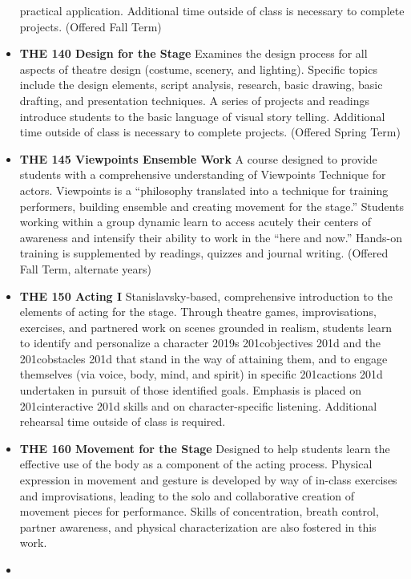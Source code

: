 \documentclass[
  letterpaper,
]{scrbook}
\begin{document}
\begin{itemize}
  practical application. Additional time outside of class is necessary
  to complete projects. (Offered Fall Term)\\
\item
  \textbf{THE 140 Design for the Stage} Examines the design process for
  all aspects of theatre design (costume, scenery, and lighting).
  Specific topics include the design elements, script analysis,
  research, basic drawing, basic drafting, and presentation techniques.
  A series of projects and readings introduce students to the basic
  language of visual story telling. Additional time outside of class is
  necessary to complete projects. (Offered Spring Term)
\item
  \textbf{THE 145 Viewpoints Ensemble Work} A course designed to provide
  students with a comprehensive understanding of Viewpoints Technique
  for actors. Viewpoints is a ``philosophy translated into a technique
  for training performers, building ensemble and creating movement for
  the stage.'' Students working within a group dynamic learn to access
  acutely their centers of awareness and intensify their ability to work
  in the ``here and now.'' Hands-on training is supplemented by
  readings, quizzes and journal writing. (Offered Fall Term, alternate
  years)\\
\item
  \textbf{THE 150 Acting I} Stanislavsky-based, comprehensive
  introduction to the elements of acting for the stage. Through theatre
  games, improvisations, exercises, and partnered work on scenes
  grounded in realism, students learn to identify and personalize a
  character 2019s 201cobjectives 201d and the 201cobstacles 201d that
  stand in the way of attaining them, and to engage themselves (via
  voice, body, mind, and spirit) in specific 201cactions 201d undertaken
  in pursuit of those identified goals. Emphasis is placed on
  201cinteractive 201d skills and on character-specific listening.
  Additional rehearsal time outside of class is required.
\item
  \textbf{THE 160 Movement for the Stage} Designed to help students
  learn the effective use of the body as a component of the acting
  process. Physical expression in movement and gesture is developed by
  way of in-class exercises and improvisations, leading to the solo and
  collaborative creation of movement pieces for performance. Skills of
  concentration, breath control, partner awareness, and physical
  characterization are also fostered in this work.\\
\item

\end{itemize}
\end{document}

